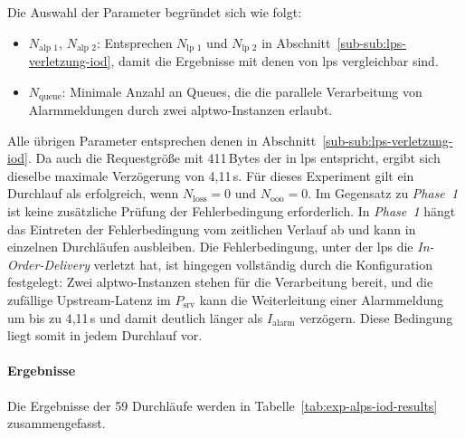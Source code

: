 Die Auswahl der Parameter begründet sich wie folgt:

\begin{itemize}
    \item $N_{\text{alp~1}}$, $N_{\text{alp~2}}$: Entsprechen $N_{\text{lp~1}}$ und $N_{\text{lp~2}}$ in Abschnitt~\ref{sub-sub:lps-verletzung-iod}, damit die Ergebnisse mit denen von \gls{lps} vergleichbar sind.
    \item $N_{\text{queue}}$: Minimale Anzahl an Queues, die die parallele Verarbeitung von Alarmmeldungen durch zwei \gls{alptwo}-Instanzen erlaubt.
\end{itemize}

Alle übrigen Parameter entsprechen denen in Abschnitt~\ref{sub-sub:lps-verletzung-iod}. Da auch die Requestgröße mit 411\,Bytes der in \gls{lps} entspricht, ergibt sich dieselbe maximale Verzögerung von 4{,}11\,s. Für dieses Experiment gilt ein Durchlauf als erfolgreich, wenn $N_{\text{loss}} = 0$ und $N_{\text{ooo}} = 0$. Im Gegensatz zu \textit{Phase~1} ist keine zusätzliche Prüfung der Fehlerbedingung erforderlich. In \textit{Phase~1} hängt das Eintreten der Fehlerbedingung vom zeitlichen Verlauf ab und kann in einzelnen Durchläufen ausbleiben. Die Fehlerbedingung, unter der \gls{lps} die \textit{In-Order-Delivery} verletzt hat, ist hingegen vollständig durch die Konfiguration festgelegt: Zwei \gls{alptwo}-Instanzen stehen für die Verarbeitung bereit, und die zufällige Upstream-Latenz im $P_{\text{srv}}$ kann die Weiterleitung einer Alarmmeldung um bis zu 4{,}11\,s und damit deutlich länger als $I_{\text{alarm}}$ verzögern. Diese Bedingung liegt somit in jedem Durchlauf vor.

\paragraph{Ergebnisse} Die Ergebnisse der 59 Durchläufe werden in Tabelle~\ref{tab:exp-alps-iod-results} zusammengefasst.


